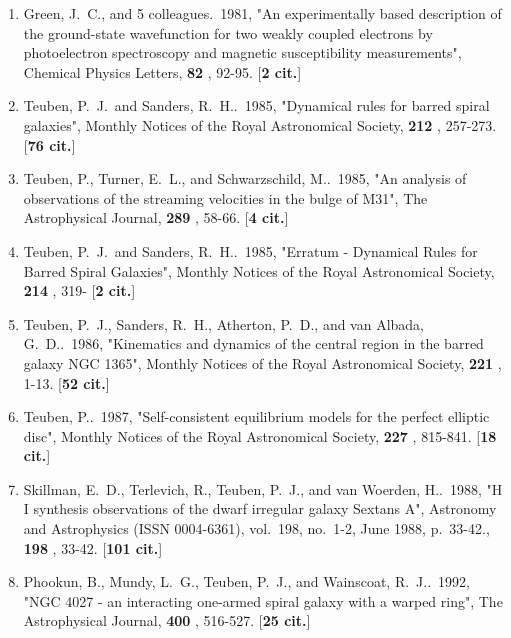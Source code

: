 \documentclass[11pt,letterpaper]{article}
\begin{document}
\begin{enumerate}[resume,label=\textbf{\arabic*}.]

\item  
Green, J.~C., and 5 colleagues.\  1981,  "An experimentally based 
description of the ground-state wavefunction for two weakly coupled 
electrons by photoelectron spectroscopy and magnetic susceptibility 
measurements", Chemical Physics Letters,  {\bf 82} , 92-95.  [{\bf 2 cit.}] 

\item  
Teuben, P.~J.~and Sanders, R.~H..\  1985,  "Dynamical rules for barred 
spiral galaxies", Monthly Notices of the Royal Astronomical Society,  {\bf 
212} , 257-273.  [{\bf 76 cit.}] 

\item  
Teuben, P., Turner, E.~L., and Schwarzschild, M..\  1985,  "An analysis of 
observations of the streaming velocities in the bulge of M31", The 
Astrophysical Journal,  {\bf 289} , 58-66.  [{\bf 4 cit.}] 

\item  
Teuben, P.~J.~and Sanders, R.~H..\  1985,  "Erratum - Dynamical Rules for 
Barred Spiral Galaxies", Monthly Notices of the Royal Astronomical Society,  
{\bf 214} , 319- [{\bf 2 cit.}] 

\item  
Teuben, P.~J., Sanders, R.~H., Atherton, P.~D., and van Albada, G.~D..\  
1986,  "Kinematics and dynamics of the central region in the barred galaxy 
NGC 1365", Monthly Notices of the Royal Astronomical Society,  {\bf 221} , 
1-13.  [{\bf 52 cit.}] 

\item  
Teuben, P..\  1987,  "Self-consistent equilibrium models for the perfect 
elliptic disc", Monthly Notices of the Royal Astronomical Society,  {\bf 
227} , 815-841.  [{\bf 18 cit.}] 

\item  
Skillman, E.~D., Terlevich, R., Teuben, P.~J., and van Woerden, H..\  1988,  
"H I synthesis observations of the dwarf irregular galaxy Sextans A", 
Astronomy and Astrophysics (ISSN 0004-6361), vol.~198, no.~1-2, June 1988, 
p.~33-42.,  {\bf 198} , 33-42.  [{\bf 101 cit.}] 

\item  
Phookun, B., Mundy, L.~G., Teuben, P.~J., and Wainscoat, R.~J..\  1992,  
"NGC 4027 - an interacting one-armed spiral galaxy with a warped ring", The 
Astrophysical Journal,  {\bf 400} , 516-527.  [{\bf 25 cit.}] 


\end{enumerate}
\end{document}
